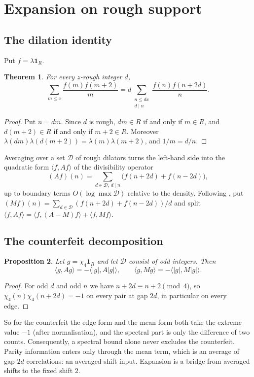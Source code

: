 \documentclass[11pt]{amsart}
\newtheorem{theorem}{Theorem}[section]
\newtheorem{proposition}[theorem]{Proposition}
\theoremstyle{definition}
\theoremstyle{remark}
\newcommand{\one}{\mathbf 1}
\newcommand{\cD}{\mathcal D}
\begin{document}
\section{Expansion on rough support}\label{sec:expansion}

\subsection{The dilation identity}
Put $f=\lambda\one_R$.

\begin{theorem}\label{thm:dilation}
For every $z$-rough integer $d$,
\[
\sum_{m\le x}\frac{f(m)f(m+2)}m=d\sum_{\substack{n\le dx\\ d\mid n}}\frac{f(n)f(n+2d)}n .
\]
\end{theorem}
\begin{proof}
Put $n=dm$. Since $d$ is rough, $dm\in R$ if and only if $m\in R$, and $d(m+2)\in R$ if and only if $m+2\in R$. Moreover $\lambda(dm)\lambda(d(m+2))=\lambda(m)\lambda(m+2)$, and $1/m=d/n$.
\end{proof}

Averaging over a set $\cD$ of rough dilators turns the left-hand side into the quadratic form $\langle f,Af\rangle$ of the divisibility operator
\[
(Af)(n)=\sum_{d\in\cD,\,d\mid n}\bigl(f(n+2d)+f(n-2d)\bigr),
\]
up to boundary terms $O(\log\max\cD)$ relative to the density. Following \cite{HR21}, put $(Mf)(n)=\sum_{d\in\cD}(f(n+2d)+f(n-2d))/d$ and split $\langle f,Af\rangle=\langle f,(A-M)f\rangle+\langle f,Mf\rangle$.

\subsection{The counterfeit decomposition}
\begin{proposition}\label{prop:counterfeit}
Let $g=\chi_4\one_R$ and let $\cD$ consist of odd integers. Then
\[
\langle g,Ag\rangle=-\langle|g|,A|g|\rangle,\qquad\langle g,Mg\rangle=-\langle|g|,M|g|\rangle .
\]
\end{proposition}
\begin{proof}
For odd $d$ and odd $n$ we have $n+2d\equiv n+2\pmod 4$, so $\chi_4(n)\chi_4(n+2d)=-1$ on every pair at gap $2d$, in particular on every edge.
\end{proof}

So for the counterfeit the edge form and the mean form both take the extreme value $-1$ (after normalisation), and the spectral part is only the difference of two counts. Consequently, a spectral bound alone never excludes the counterfeit. Parity information enters only through the mean term, which is an average of gap-$2d$ correlations: an averaged-shift input. Expansion is a bridge from averaged shifts to the fixed shift $2$.
\end{document}
